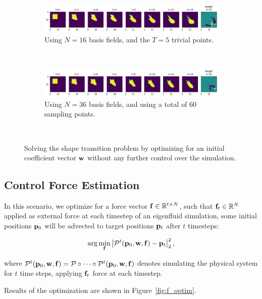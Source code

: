 \begin{figure}
\begin{subfigure}{\textwidth}
    \centering
    \includegraphics[width=\textwidth]{figures/points-velocity-only/T5/trajectory_horizontal.png}
    \caption{Using $N=16$ basis fields, and the $T=5$ trivial points.}
    \label{fig:points-vel-only-small}
  \end{subfigure}\\
  \begin{subfigure}{\textwidth}
    \centering
    \includegraphics[width=\textwidth]{figures/points-velocity-only/O30_U30_T0/trajectory_horizontal.png}
    \caption{Using $N=36$ basis fields, and using a total of $60$ sampling
    points.}
    \label{fig:points-vel-only-big}
  \end{subfigure}\\
  \caption{Solving the shape transition problem by optimizing for an initial
  coefficient vector $\vb{w}$ without any further control over the simulation.}
  \label{fig:points-vel-only}
\end{figure}

\subsection{Control Force Estimation}\label{section:cfe}
In this scenario, we optimize for a force vector $\vb{f} \in \mathbb{R}^{t\times
N}$, such that $\vb{f}_t \in \mathbb{R}^N$ applied as external force at each
timestep of an eigenfluid simulation, some initial positions $\vb{p}_0$ will be
advected to target positions $\vb{p}_t$ after $t$ timesteps:

$$\arg\min_{\vb{f}} \left| \mathcal{P}^{t}(\vb{p}_0, \vb{w}, \vb{f})
  - \vb{p}_t\right|_2^2,$$

where $\mathcal{P}^{t}(\vb{p}_0, \vb{w}, \vb{f}) = \mathcal{P} \circ \dots
\circ \mathcal{P}^{t}(\vb{p}_0, \vb{w}, \vb{f})$ denotes simulating the
physical system for $t$ time steps, applying $\vb{f}_t$ force at each
timestep.

Results of the optimization are shown in Figure~\ref{fig:f_optim}.

